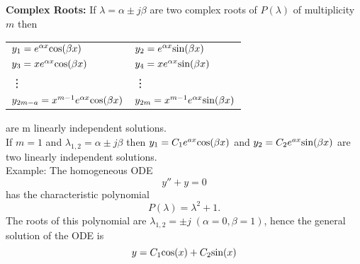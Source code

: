 \textbf{Complex Roots:}
If $\lambda = \alpha \pm j\beta$ are two complex roots of $P(\lambda)$ of multiplicity $m$ then
\begin{table}[H]
  \begin{tabular}{ll}
    $y_1 = e^{\alpha x} \textup{cos}(\beta x)$ &   $y_2 = e^{\alpha x} \textup{sin}(\beta x)$\\
    $y_3 = xe^{\alpha x} \textup{cos}(\beta x)$ &   $y_4 = xe^{\alpha x} \textup{sin}(\beta x)$\\
    \vdots  & \vdots \\
    $y_{2m-a} = x^{m-1}e^{\alpha x} \textup{cos}(\beta x)$ &   $y_{2m} = x^{m-1}e^{\alpha x} \textup{sin}(\beta x)$
  \end{tabular}
\end{table}
are m linearly independent solutions.\\
If $m = 1$ and $\lambda_{1,2} = \alpha \pm j\beta$ then $y_1 = C_1 e^{ax}\textup{cos}(\beta x)$ and $y_2 = C_2 e^{ax}\textup{sin}(\beta x)$ are two linearly
independent solutions.\\
Example: The homogeneous ODE
\begin{equation}
  y'' + y = 0
\end{equation}
has the characteristic polynomial
\begin{equation}
  P(\lambda) = \lambda^2 + 1.
\end{equation}
The roots of this polynomial are $\lambda_{1,2} = \pm j\; (\alpha = 0, \beta = 1)$, hence the general solution of the ODE is
\begin{equation}
  y = C_1 \textup{cos}(x) + C_2 \textup{sin}(x)
\end{equation}

